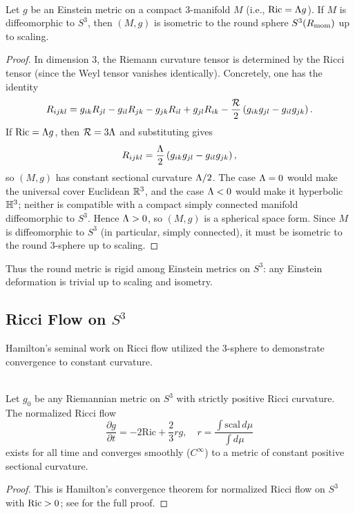 \documentclass[11pt]{article}
\begin{document}
\begin{theorem}
\label{p1:thm:einstein-uniqueness-s3}
\mbox{}\\[6pt] 
Let $g$ be an Einstein metric on a compact 3-manifold $M$ (i.e., $\operatorname{Ric} = \Lambda g$). If $M$ is diffeomorphic to $S^3$, then $(M,g)$ is isometric to the round sphere $S^3(R_{\mathrm{mom}})$ up to scaling.
\end{theorem}
\begin{proof}
In dimension $3$, the Riemann curvature tensor is determined by the Ricci tensor (since the Weyl tensor vanishes identically). Concretely, one has the identity
\[
R_{ijkl}
=
g_{ik}R_{jl}-g_{il}R_{jk}-g_{jk}R_{il}+g_{jl}R_{ik}
-\frac{\mathcal R}{2}\left(g_{ik}g_{jl}-g_{il}g_{jk}\right).
\]
If $\operatorname{Ric}=\Lambda g$, then $\mathcal R=3\Lambda$ and substituting gives
\[
R_{ijkl}
=\frac{\Lambda}{2}\left(g_{ik}g_{jl}-g_{il}g_{jk}\right),
\]
so $(M,g)$ has constant sectional curvature $\Lambda/2$. The case $\Lambda=0$ would make the universal cover Euclidean $\mathbb{R}^3$, and the case $\Lambda<0$ would make it hyperbolic $\mathbb{H}^3$; neither is compatible with a compact simply connected manifold diffeomorphic to $S^3$. Hence $\Lambda>0$, so $(M,g)$ is a spherical space form. Since $M$ is diffeomorphic to $S^3$ (in particular, simply connected), it must be isometric to the round $3$-sphere up to scaling.
\end{proof}
Thus the round metric is rigid among Einstein metrics on \(S^3\): any Einstein deformation is trivial up to scaling and isometry.

\subsection{\texorpdfstring{Ricci Flow on $S^3$}{Ricci Flow on S3}}

Hamilton's seminal work on Ricci flow utilized the 3-sphere to demonstrate convergence to constant curvature.

\begin{theorem}
\label{p1:thm:hamilton-ricci-flow-convergence}
\mbox{}\\[6pt] 
Let $g_0$ be any Riemannian metric on $S^3$ with strictly positive Ricci curvature. The normalized Ricci flow
\[
\frac{\partial g}{\partial t} = -2\mathrm{Ric} + \frac{2}{3}rg, \quad r = \frac{\int \mathrm{scal}\, d\mu}{\int d\mu}
\]
exists for all time and converges smoothly ($C^\infty$) to a metric of constant positive sectional curvature.
\end{theorem}
\begin{proof}
This is Hamilton's convergence theorem for normalized Ricci flow on $S^3$ with $\operatorname{Ric}>0$; see \cite{Hamilton1982} for the full proof.
\end{proof}
\end{document}
